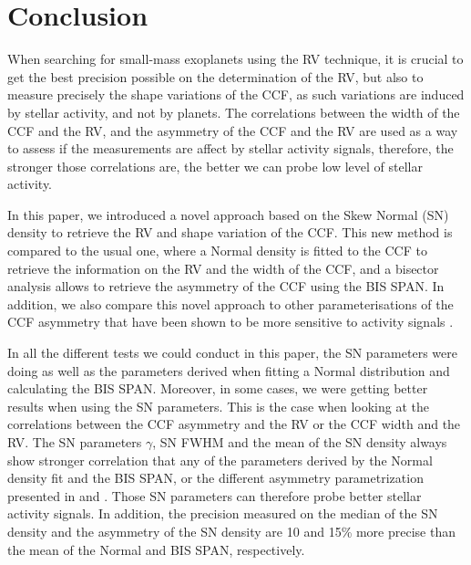\documentclass{aa}
\begin{document}

\section{Conclusion} \label{sec:conclu}

When searching for small-mass exoplanets using the RV technique, it is crucial to get the best precision possible on the determination of the RV, but also to measure precisely the shape variations of the CCF, as such variations are induced by stellar activity, and not by planets. The correlations between the width of the CCF and the RV, and the asymmetry of the CCF and the RV are used as a way to assess if the measurements are affect by stellar activity signals, therefore, the stronger those correlations are, the better we can probe low level of stellar activity.

In this paper, we introduced a novel approach based on the Skew Normal (SN) density to retrieve the RV and shape variation of the CCF. This new method is compared to the usual one, where a Normal density is fitted to the CCF to retrieve the information on the RV and the width of the CCF, and a bisector analysis allows to retrieve the asymmetry of the CCF using the BIS SPAN. In addition, we also compare this novel approach to other parameterisations of the CCF asymmetry that have been shown to be more sensitive to activity signals \citep[][]{Boisse-2011,Figueira-2013}.

In all the different tests we could conduct in this paper, the SN parameters were doing as well as the parameters derived when fitting a Normal distribution and calculating the BIS SPAN.
Moreover, in some cases, we were getting better results when using the SN parameters. This is the case when looking at the correlations between the CCF asymmetry and the RV or the CCF width and the RV. The SN parameters $\gamma$, SN FWHM and the mean of the SN density always show stronger correlation that any of the parameters derived by the Normal density fit and the BIS SPAN, or the different asymmetry parametrization presented in \citet{Boisse-2011} and \citet{Figueira-2013}. Those SN parameters can therefore probe better stellar activity signals. In addition, the precision measured on the median of the SN density and the asymmetry of the SN density are 10 and 15\% more precise than the mean of the Normal and BIS SPAN, respectively.
\end{document}
